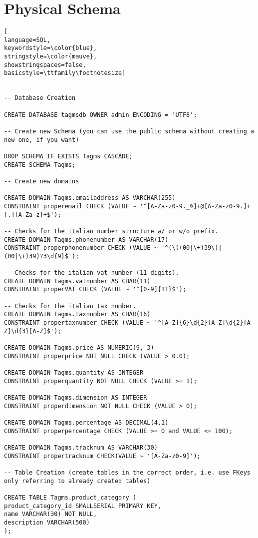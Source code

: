 \section{Physical Schema}


\begin{lstlisting}[
language=SQL,
keywordstyle=\color{blue},
stringstyle=\color{mauve},
showstringspaces=false,
basicstyle=\ttfamily\footnotesize]


-- Database Creation

CREATE DATABASE tagmsdb OWNER admin ENCODING = 'UTF8';

-- Create new Schema (you can use the public schema without creating a new one, if you want)

DROP SCHEMA IF EXISTS Tagms CASCADE;
CREATE SCHEMA Tagms;

-- Create new domains

CREATE DOMAIN Tagms.emailaddress AS VARCHAR(255)
CONSTRAINT properemail CHECK (VALUE ~ '^[A-Za-z0-9._%]+@[A-Za-z0-9.]+[.][A-Za-z]+$');

-- Checks for the italian number structure w/ or w/o prefix.
CREATE DOMAIN Tagms.phonenumber AS VARCHAR(17)
CONSTRAINT properphonenumber CHECK (VALUE ~ '^(\((00|\+)39\)|(00|\+)39)?3\d{9}$');

-- Checks for the italian vat number (11 digits).
CREATE DOMAIN Tagms.vatnumber AS CHAR(11)
CONSTRAINT properVAT CHECK (VALUE ~ '^[0-9]{11}$');

-- Checks for the italian tax number.
CREATE DOMAIN Tagms.taxnumber AS CHAR(16)
CONSTRAINT propertaxnumber CHECK (VALUE ~ '^[A-Z]{6}\d{2}[A-Z]\d{2}[A-Z]\d{3}[A-Z]$');

CREATE DOMAIN Tagms.price AS NUMERIC(9, 3)
CONSTRAINT properprice NOT NULL CHECK (VALUE > 0.0);

CREATE DOMAIN Tagms.quantity AS INTEGER
CONSTRAINT properquantity NOT NULL CHECK (VALUE >= 1);

CREATE DOMAIN Tagms.dimension AS INTEGER
CONSTRAINT properdimension NOT NULL CHECK (VALUE > 0);

CREATE DOMAIN Tagms.percentage AS DECIMAL(4,1)
CONSTRAINT properpercentage CHECK (VALUE >= 0 and VALUE <= 100);

CREATE DOMAIN Tagms.tracknum AS VARCHAR(30)
CONSTRAINT propertracknum CHECK(VALUE ~ '[A-Za-z0-9]');

-- Table Creation (create tables in the correct order, i.e. use FKeys only referring to already created tables)

CREATE TABLE Tagms.product_category (
product_category_id SMALLSERIAL PRIMARY KEY,
name VARCHAR(30) NOT NULL,
description VARCHAR(500)
);


\end{lstlisting}
